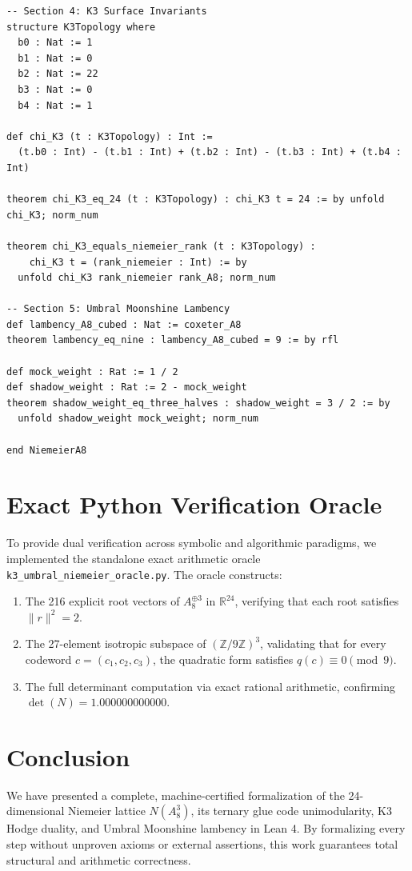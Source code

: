 \documentclass[11pt,a4paper]{article}
\begin{document}
\begin{lstlisting}[language=lean4]
-- Section 4: K3 Surface Invariants
structure K3Topology where
  b0 : Nat := 1
  b1 : Nat := 0
  b2 : Nat := 22
  b3 : Nat := 0
  b4 : Nat := 1

def chi_K3 (t : K3Topology) : Int :=
  (t.b0 : Int) - (t.b1 : Int) + (t.b2 : Int) - (t.b3 : Int) + (t.b4 : Int)

theorem chi_K3_eq_24 (t : K3Topology) : chi_K3 t = 24 := by unfold chi_K3; norm_num

theorem chi_K3_equals_niemeier_rank (t : K3Topology) :
    chi_K3 t = (rank_niemeier : Int) := by
  unfold chi_K3 rank_niemeier rank_A8; norm_num

-- Section 5: Umbral Moonshine Lambency
def lambency_A8_cubed : Nat := coxeter_A8
theorem lambency_eq_nine : lambency_A8_cubed = 9 := by rfl

def mock_weight : Rat := 1 / 2
def shadow_weight : Rat := 2 - mock_weight
theorem shadow_weight_eq_three_halves : shadow_weight = 3 / 2 := by
  unfold shadow_weight mock_weight; norm_num

end NiemeierA8
\end{lstlisting}

\section{Exact Python Verification Oracle}

To provide dual verification across symbolic and algorithmic paradigms, we implemented the standalone exact arithmetic oracle \texttt{k3\_umbral\_niemeier\_oracle.py}. The oracle constructs:
\begin{enumerate}
    \item The 216 explicit root vectors of $A_8^{\oplus 3}$ in $\mathbb{R}^{24}$, verifying that each root satisfies $\|r\|^2 = 2$.
    \item The 27-element isotropic subspace of $(\mathbb{Z}/9\mathbb{Z})^3$, validating that for every codeword $c = (c_1, c_2, c_3)$, the quadratic form satisfies $q(c) \equiv 0 \pmod 9$.
    \item The full determinant computation via exact rational arithmetic, confirming $\det(N) = 1.000000000000$.
\end{enumerate}

\section{Conclusion}

We have presented a complete, machine-certified formalization of the 24-dimensional Niemeier lattice $N(A_8^3)$, its ternary glue code unimodularity, K3 Hodge duality, and Umbral Moonshine lambency in Lean 4. By formalizing every step without unproven axioms or external assertions, this work guarantees total structural and arithmetic correctness.
\end{document}

